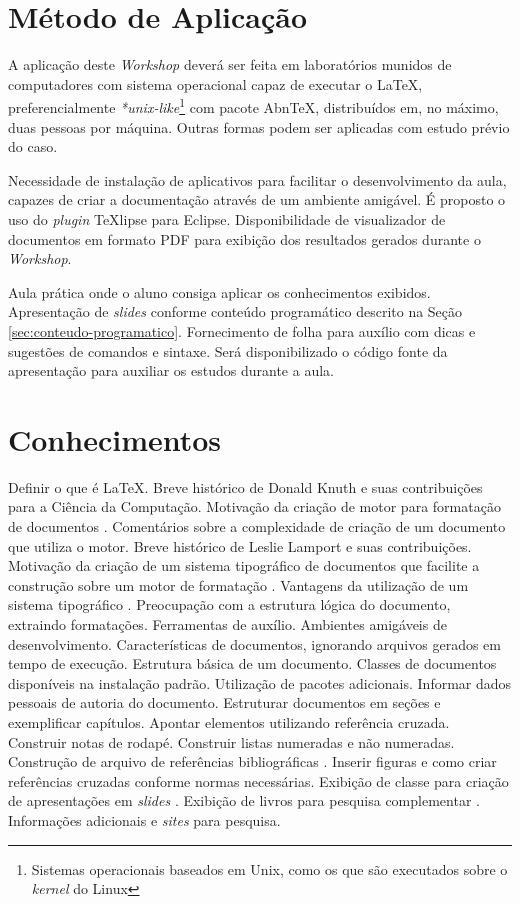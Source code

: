 \documentclass{article}
\begin{document}
\section{Método de Aplicação}
\label{sec:metodo-de-aplicacao}

A aplicação deste \emph{Workshop} deverá ser feita em laboratórios munidos de
computadores com sistema operacional capaz de executar o \LaTeX{},
preferencialmente \emph{*unix-like}\footnote{Sistemas operacionais baseados em
Unix, como os que são executados sobre o \emph{kernel} do Linux} com pacote
Abn\TeX{}, distribuídos em, no máximo, duas pessoas por máquina. Outras formas
podem ser aplicadas com estudo prévio do caso.

Necessidade de instalação de aplicativos para facilitar o desenvolvimento da
aula, capazes de criar a documentação através de um ambiente amigável. É
proposto o uso do \emph{plugin} \TeX{}lipse para Eclipse. Disponibilidade de
visualizador de documentos em formato PDF para exibição dos resultados gerados
durante o \emph{Workshop}.

Aula prática onde o aluno consiga aplicar os conhecimentos exibidos.
Apresentação de \emph{slides} conforme conteúdo programático descrito na Seção
\ref{sec:conteudo-programatico}. Fornecimento de folha para auxílio com dicas e
sugestões de comandos e sintaxe. Será disponibilizado o código fonte da
apresentação para auxiliar os estudos durante a aula.

\section{Conhecimentos}
\label{sec:conhecimentos}

Definir o que é \LaTeX{}. Breve histórico de Donald Knuth e suas contribuições
para a Ciência da Computação. Motivação da criação de motor para formatação de
documentos \cite{knuth1970}. Comentários sobre a complexidade de criação de um
documento que utiliza o motor. Breve histórico de Leslie Lamport e suas
contribuições. Motivação da criação de um sistema tipográfico de documentos que
facilite a construção sobre um motor de formatação \cite{lamport1985}. Vantagens
da utilização de um sistema tipográfico \cite{oetiker2008}. Preocupação com a
estrutura lógica do documento, extraindo formatações. Ferramentas de auxílio.
Ambientes amigáveis de desenvolvimento. Características de documentos, ignorando
arquivos gerados em tempo de execução. Estrutura básica de um documento. Classes
de documentos disponíveis na instalação padrão. Utilização de pacotes
adicionais. Informar dados pessoais de autoria do documento. Estruturar
documentos em seções e exemplificar capítulos. Apontar elementos utilizando
referência cruzada. Construir notas de rodapé. Construir listas numeradas e não
numeradas. Construção de arquivo de referências bibliográficas
\cite{patashnik1988}. Inserir figuras e como criar referências cruzadas conforme
normas necessárias. Exibição de classe para criação de apresentações em
\emph{slides} \cite{tantau2005}. Exibição de livros para pesquisa complementar
\cite{fiorio2005,moses2007,mittelback2004,downes2002}. Informações adicionais e
\emph{sites} para pesquisa.
\end{document}
